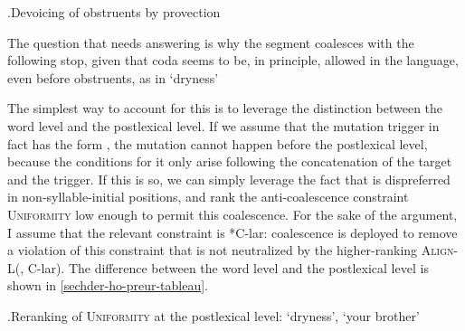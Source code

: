 \ex.\label{ex:provection-obst-autoseg-bothoa}Devoicing of obstruents by provection\\

The question that needs answering is why the segment \ipa{[h]} coalesces with the following stop, given that coda \ipa{[h]} seems to be, in principle, allowed in the language, even before obstruents, as in \ipa{[ˈzɛhtər]} `dryness'

The simplest way to account for this is to leverage the distinction between the word level and the postlexical level. If we assume that the mutation trigger in fact has the form , the mutation cannot happen before the postlexical level, because the conditions for it only arise following the concatenation of the target and the trigger. If this is so, we can simply leverage the fact that  is dispreferred in non\hyp syllable\hyp initial positions, and rank the anti\hyp coalescence constraint \textsc{Uniformity} low enough to permit this coalescence. For the sake of the argument, I assume that the relevant constraint is *C-lar: coalescence is deployed to remove a violation of this constraint that is not neutralized by the higher\hyp ranking \textsc{Align-L}(\sy, C-lar). The difference between the word level and the postlexical level is shown in \cref{sechder-ho-preur-tableau}.

\ex.\label{sechder-ho-preur-tableau}Reranking of \textsc{Uniformity} at the postlexical level: \ipa{[ˈzɛhtər]} `dryness', \ipa{[o ˈprøːr]} `your brother'\\

